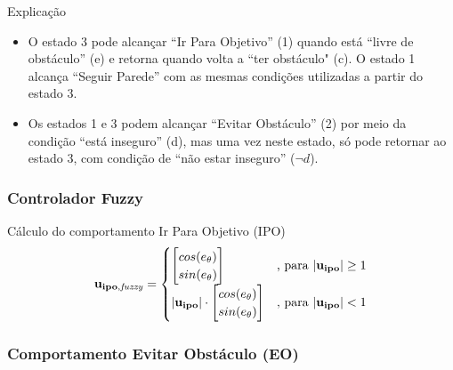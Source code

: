 \begin{frame}
	\begin{exampleblock}{Explicação}
		\begin{itemize}
		  \item O estado 3 pode alcançar ``Ir Para Objetivo'' (1) quando está ``livre de obstáculo'' (e)
		e retorna quando volta a ``ter obstáculo" (c). O estado 1 alcança ``Seguir Parede'' com
		as mesmas condições utilizadas a partir do estado 3.
		\pause 
		  \item Os estados 1 e 3 podem alcançar ``Evitar Obstáculo'' (2) por meio da condição ``está
		inseguro'' (d), mas uma vez neste estado, só pode retornar ao estado 3, com condição de
		``não estar inseguro'' ($\neg d$).
		\end{itemize}
	\end{exampleblock}
\end{frame}

\begin{frame}
	\frametitle{Controlador Fuzzy}
	\begin{exampleblock}{Cálculo do comportamento Ir Para Objetivo (IPO)}
		\begin{equation}
			\mathbf{u_{ipo,\mathit{fuzzy}}} = 
			\begin{cases}
				\mleft[
				\begin{matrix}
		  			cos(e_\theta) \\
		  			sin(e_\theta) \\
				\end{matrix}
				\mright] & \text{, para} \ | \mathbf{u_{ipo}} | \geq 1 \\
				| \mathbf{u_{ipo}} | \cdot \mleft[
				\begin{matrix}
		  			cos(e_\theta) \\
		  			sin(e_\theta) \\
				\end{matrix}
				\mright] & \text{, para} \ | \mathbf{u_{ipo}} | < 1 \\
			\end{cases}
		\end{equation}
	\end{exampleblock}
\end{frame}

\begin{frame}
	\frametitle{Comportamento Evitar Obstáculo (EO)}
	
\end{frame}

\begin{frame}
	
\end{frame}

